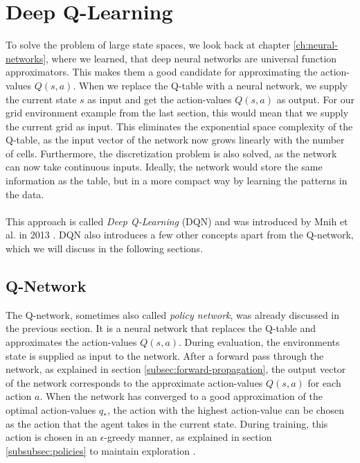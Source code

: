 \section{Deep Q-Learning}
\label{subsec:deep-q-learning}
To solve the problem of large state spaces, we look back at chapter \ref{ch:neural-networks}, where we learned, that deep neural networks are universal function approximators. This makes them a good candidate for approximating the action-values $Q(s,a)$. When we replace the Q-table with a neural network, we supply the current state $s$ as input and get the action-values $Q(s,a)$ as output. For our grid environment example from the last section, this would mean that we supply the current grid as input. This eliminates the exponential space complexity of the Q-table, as the input vector of the network now grows linearly with the number of cells. Furthermore, the discretization problem is also solved, as the network can now take continuous inputs. Ideally, the network would store the same information as the table, but in a more compact way by learning the patterns in the data.  
\\
\\
This approach is called \textit{Deep Q-Learning} (DQN) and was introduced by Mnih et al. in 2013 \cite{mnih_playing_2013}. DQN also introduces a few other concepts apart from the Q-network, which we will discuss in the following sections.

\subsection{Q-Network}
\label{subsec:q-network}
The Q-network, sometimes also called \textit{policy network}, was already discussed in the previous section. It is a neural network that replaces the Q-table and approximates the action-values $Q(s,a)$. During evaluation, the environments state is supplied as input to the network. After a forward pass through the network, as explained in section \ref{subsec:forward-propagation}, the output vector of the network corresponds to the approximate action-values $Q(s,a)$ for each action $a$. When the network has converged to a good approximation of the optimal action-values $q_*$, the action with the highest action-value can be chosen as the action that the agent takes in the current state. During training, this action is chosen in an $\epsilon$-greedy manner, as explained in section \ref{subsubsec:policies} to maintain exploration \cite{mnih_human-level_2015}. 

